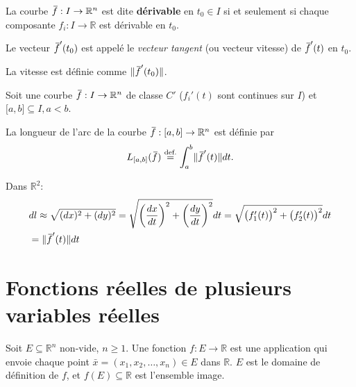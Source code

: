 \documentclass{report}
\newcommand*\eqdef{\; \stackrel{ \mathclap{ \normalfont\text{def.} } }{ = } \;} %
\newcommand*{\skol}[2][3]{{}\mkern#1mu\overline{\mkern-#1mu#2}} %
\newcommand*\adh[1]{\skol{#1}}
\newcommand*{\norm}[1]{\lVert#1\rVert}
\begin{document}
\begin{defn}
	La courbe $\adh f : I \to \mathbb R^n$ est dite \textbf{dérivable} en $t_0 \in I$ si et seulement si chaque composante $f_i : I \to \mathbb R$ est dérivable en $t_0$. \par
	Le vecteur $\adh f'(t_0)$ est appelé le \emph{vecteur tangent} (ou vecteur vitesse) de $\adh f'(t)$ en $t_0$. \par
	La vitesse est définie comme $\norm{\adh f'(t_0)}$.
\end{defn}

\begin{defn}
	Soit une courbe $\adh f : I \to \mathbb R^n$ de classe $C'$ ($f_i'(t)$ sont continues sur $I$) et $\mathopen[a, b \mathclose] \subseteq I, a < b$. \par 
	La longueur de l'arc de la courbe $\adh f : \mathopen[a, b \mathclose] \to \mathbb R^n$ est définie par
	\begin{equation}
		L_{\mathopen[a, b \mathclose]}(\adh f) \eqdef \int_a^b \norm{\adh f'(t)} dt.
	\end{equation}
\end{defn}
\begin{idea}
	Dans $\mathbb R^2$:
	\begin{align*}
		&dl \approx \sqrt{(dx)^2 + (dy)^2} = \sqrt{\left(\frac{dx}{dt}\right)^2 + \left(\frac{dy}{dt}\right)^2}dt = \sqrt{\bigl(f_1'(t)\bigr)^2 + \bigl(f_2'(t)\bigr)^2}dt \\
		&= \norm{\adh f'(t)}dt
	\end{align*}
\end{idea}

\chapter{Fonctions réelles de plusieurs variables réelles}

\begin{defn}
	Soit $E \subseteq \mathbb R^n$ non-vide, $n \geq 1$. Une fonction $f : E \to \mathbb R$ est une application qui envoie chaque point $\bar x = (x_1, x_2, \ldots, x_n) \in E$ dans $\mathbb R$. $E$ est le domaine de définition de $f$, et $f(E) \subseteq \mathbb R$ est l'ensemble image.
\end{defn}
\end{document}
